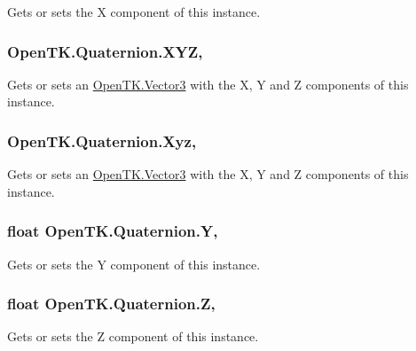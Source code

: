 Gets or sets the X component of this instance. 

\hypertarget{struct_open_t_k_1_1_quaternion_ac93b88de0dfdbc1fc7561717b4c60195}{
\subsubsection[{X\-Y\-Z}]{ Open\-T\-K.\-Quaternion.\-X\-Y\-Z\hspace{0.3cm}{\ttfamily [get]}, {\ttfamily [set]}}}\label{struct_open_t_k_1_1_quaternion_ac93b88de0dfdbc1fc7561717b4c60195}


Gets or sets an \hyperlink{struct_open_t_k_1_1_vector3}{Open\-T\-K.\-Vector3} with the X, Y and Z components of this instance. 

\hypertarget{struct_open_t_k_1_1_quaternion_a179592a60e7facac046589a6aabc2d41}{
\subsubsection[{Xyz}]{ Open\-T\-K.\-Quaternion.\-Xyz\hspace{0.3cm}{\ttfamily [get]}, {\ttfamily [set]}}}\label{struct_open_t_k_1_1_quaternion_a179592a60e7facac046589a6aabc2d41}


Gets or sets an \hyperlink{struct_open_t_k_1_1_vector3}{Open\-T\-K.\-Vector3} with the X, Y and Z components of this instance. 

\hypertarget{struct_open_t_k_1_1_quaternion_aad3fdabef1cdc7fd69a807fd043fe1d3}{
\subsubsection[{Y}]{\setlength{\rightskip}{0pt plus 5cm}float Open\-T\-K.\-Quaternion.\-Y\hspace{0.3cm}{\ttfamily [get]}, {\ttfamily [set]}}}\label{struct_open_t_k_1_1_quaternion_aad3fdabef1cdc7fd69a807fd043fe1d3}


Gets or sets the Y component of this instance. 

\hypertarget{struct_open_t_k_1_1_quaternion_af184db9f0b3958e0ab8c1ef0eb0667f7}{
\subsubsection[{Z}]{\setlength{\rightskip}{0pt plus 5cm}float Open\-T\-K.\-Quaternion.\-Z\hspace{0.3cm}{\ttfamily [get]}, {\ttfamily [set]}}}\label{struct_open_t_k_1_1_quaternion_af184db9f0b3958e0ab8c1ef0eb0667f7}


Gets or sets the Z component of this instance. 

